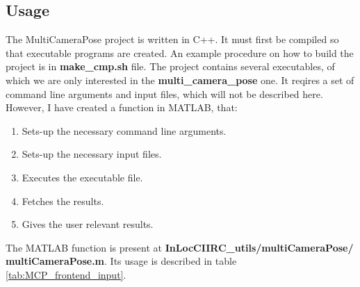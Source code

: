 \documentclass[twoside]{ctuthesis}
\theoremstyle{plain}
\theoremstyle{definition}
\theoremstyle{note}
\begin{document}
\subsection{Usage}
The MultiCameraPose project is written in C++. It must first be compiled so that executable programs are created. An example procedure on how to build the project is in \textbf{make\_cmp.sh} file. The project contains several executables, of which we are only interested in the \textbf{multi\_camera\_pose} one. It reqires a set of command line arguments and input files, which will not be described here. However, I have created a function in MATLAB, that:

\begin{enumerate}
	\item Sets-up the necessary command line arguments.
	\item Sets-up the necessary input files.
	\item Executes the executable file.
	\item Fetches the results.
	\item Gives the user relevant results.
\end{enumerate}

The MATLAB function is present at \textbf{InLocCIIRC\_utils/multiCameraPose/ \allowbreak multiCameraPose.m}. Its usage is described in table \ref{tab:MCP_frontend_input}.
\end{document}
